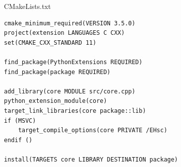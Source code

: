 \documentclass[pdf]{beamer}
\begin{document}
\begin{frame}[fragile]{CMakeLists.txt}
    \begin{lstlisting}[basicstyle=\ttfamily\scriptsize]
cmake_minimum_required(VERSION 3.5.0)
project(extension LANGUAGES C CXX)
set(CMAKE_CXX_STANDARD 11)

find_package(PythonExtensions REQUIRED)
find_package(package REQUIRED)

add_library(core MODULE src/core.cpp)
python_extension_module(core)
target_link_libraries(core package::lib)
if (MSVC)
    target_compile_options(core PRIVATE /EHsc)
endif ()

install(TARGETS core LIBRARY DESTINATION package)
    \end{lstlisting}

\end{frame}
\end{document}
